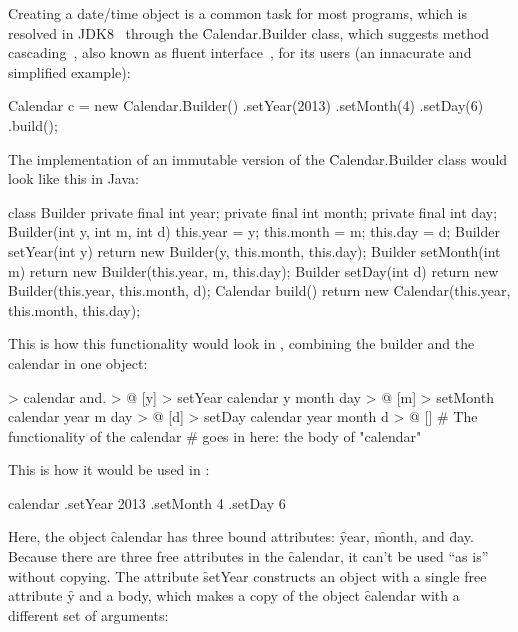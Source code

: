 Creating a date/time object is a common task for most programs, which
is resolved in JDK8~\citep{jdk8} through the \f{Calendar.Builder} class,
which suggests method cascading~\citep{beck1997smalltalk},
also known as fluent interface~\cite{fluentinterface}, for its users
(an innacurate and simplified example):

\begin{eocode}
Calendar c = new Calendar.Builder()
  .setYear(2013)
  .setMonth(4)
  .setDay(6)
  .build();
\end{eocode}

The implementation of an immutable version of the \f{Calendar.Builder}
class would look like this in Java:

\begin{eocode}
class Builder {
  private final int year;
  private final int month;
  private final int day;
  Builder(int y, int m, int d) {
    this.year = y;
    this.month = m;
    this.day = d;
  }
  Builder setYear(int y) {
    return new Builder(y, this.month, this.day);
  }
  Builder setMonth(int m) {
    return new Builder(this.year, m, this.day);
  }
  Builder setDay(int d) {
    return new Builder(this.year, this.month, d);
  }
  Calendar build() {
    return new Calendar(this.year, this.month, this.day);
  }
}
\end{eocode}

This is how this functionality would look in \eo{}, combining
the builder and the calendar in one object:

\begin{eocode}
 > calendar
  and. > @
    [y] > setYear
      calendar y month day > @
    [m] > setMonth
      calendar year m day > @
    [d] > setDay
      calendar year month d > @
    []
      # The functionality of the calendar
      # goes in here: the body of "calendar"
\end{eocode}

This is how it would be used in \eo{}:

\begin{eocode}
calendar
.setYear 2013
.setMonth 4
.setDay 6
\end{eocode}

Here, the object \f{calendar} has three bound
attributes: \f{year}, \f{month}, and \f{day}. Because there
are three free attributes in the \f{calendar}, it can't be used ``as is''
without copying. The attribute \f{setYear} constructs an object
with a single free attribute \f{y} and a body, which makes a copy
of the object \f{calendar} with a different set of arguments:


